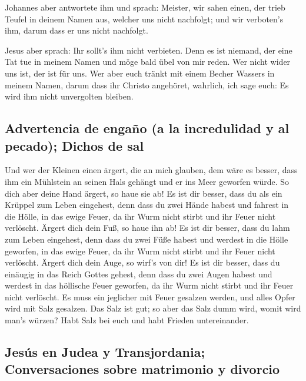  Johannes aber antwortete ihm und sprach: Meister, wir
sahen einen, der trieb Teufel in deinem Namen aus, welcher uns nicht
nachfolgt; und wir verboten's ihm, darum dass er uns nicht nachfolgt.

 Jesus aber sprach: Ihr sollt's ihm nicht verbieten. Denn
es ist niemand, der eine Tat tue in meinem Namen und möge bald übel von
mir reden.  Wer nicht wider uns ist, der ist für uns.
 Wer aber euch tränkt mit einem Becher Wassers in meinem
Namen, darum dass ihr Christo angehöret, wahrlich, ich sage euch: Es
wird ihm nicht unvergolten bleiben.

\hypertarget{advertencia-de-engauxf1o-a-la-incredulidad-y-al-pecado-dichos-de-sal}{%
\subsection{Advertencia de engaño (a la incredulidad y al pecado);
Dichos de
sal}\label{advertencia-de-engauxf1o-a-la-incredulidad-y-al-pecado-dichos-de-sal}}

 Und wer der Kleinen einen ärgert, die an mich glauben,
dem wäre es besser, dass ihm ein Mühlstein an seinen Hals gehängt und er
ins Meer geworfen würde.  So dich aber deine Hand ärgert,
so haue sie ab! Es ist dir besser, dass du als ein Krüppel zum Leben
eingehest, denn dass du zwei Hände habest und fahrest in die Hölle, in
das ewige Feuer,  da ihr Wurm nicht stirbt und ihr Feuer
nicht verlöscht.  Ärgert dich dein Fuß, so haue ihn ab!
Es ist dir besser, dass du lahm zum Leben eingehest, denn dass du zwei
Füße habest und werdest in die Hölle geworfen, in das ewige Feuer,
 da ihr Wurm nicht stirbt und ihr Feuer nicht verlöscht.
 Ärgert dich dein Auge, so wirf's von dir! Es ist dir
besser, dass du einäugig in das Reich Gottes gehest, denn dass du zwei
Augen habest und werdest in das höllische Feuer geworfen,
 da ihr Wurm nicht stirbt und ihr Feuer nicht verlöscht.
 Es muss ein jeglicher mit Feuer gesalzen werden, und
alles Opfer wird mit Salz gesalzen.  Das Salz ist gut; so
aber das Salz dumm wird, womit wird man's würzen? Habt Salz bei euch und
habt Frieden untereinander.

\hypertarget{jesuxfas-en-judea-y-transjordania-conversaciones-sobre-matrimonio-y-divorcio}{%
\subsection{Jesús en Judea y Transjordania; Conversaciones sobre
matrimonio y
divorcio}\label{jesuxfas-en-judea-y-transjordania-conversaciones-sobre-matrimonio-y-divorcio}}

